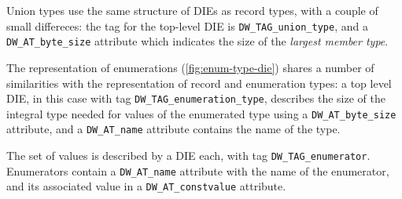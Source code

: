 
Union types use the same structure of DIEs as record types, with a couple of
small differeces: the tag for the top-level DIE is \verb|DW_TAG_union_type|,
and a \verb|DW_AT_byte_size| attribute which indicates the size of the
\emph{largest member type}.



The representation of enumerations (\autoref{fig:enum-type-die}) shares
a number of similarities with the representation of record and enumeration
types: a top level DIE, in this case with tag \verb|DW_TAG_enumeration_type|,
describes the size of the integral type needed for values of the enumerated
type using a \verb|DW_AT_byte_size| attribute, and a \verb|DW_AT_name|
attribute contains the name of the type.

The set of values is described by a DIE each, with tag
\verb|DW_TAG_enumerator|. Enumerators contain a \verb|DW_AT_name| attribute
with the name of the enumerator, and its associated value in
a \verb|DW_AT_constvalue| attribute.


